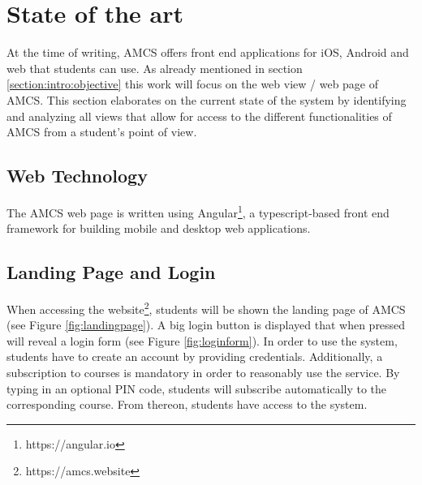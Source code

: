 \chapter{State of the art}
\label{chapter:stateoftheart}
At the time of writing, AMCS offers front end applications for iOS, Android and web that students can use. As already mentioned in section \ref{section:intro:objective} this work will focus on the web view / web page of AMCS.
This section elaborates on the current state of the system by identifying and analyzing all views that allow for access to the different functionalities of AMCS from a student's point of view. 

\section{Web Technology}
The AMCS web page is written using Angular\footnote{https://angular.io}, a typescript-based front end framework for building mobile and desktop web applications.

\section{Landing Page and Login}
\label{section:landingpage}
When accessing the website\footnote{https://amcs.website}, students will be shown the landing page of AMCS (see Figure \ref{fig:landingpage}). A big login button is displayed that when pressed will reveal a login form (see Figure \ref{fig:loginform}).
In order to use the system, students have to create an account by providing credentials.
\newline
\newline
Additionally, a subscription to courses is mandatory in order to reasonably use the service. By typing in an optional PIN code, students will subscribe automatically to the corresponding course. From thereon, students have access to the system. 
 
